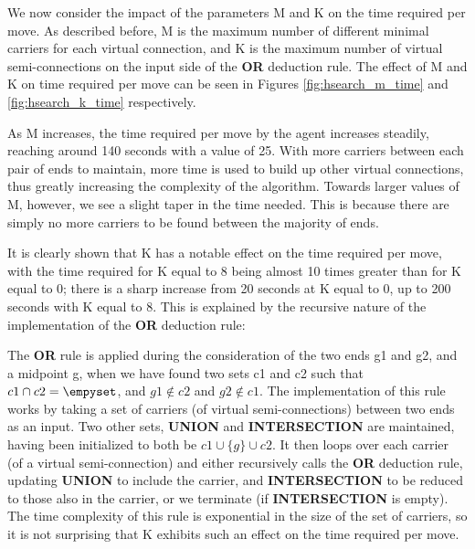 We now consider the impact of the parameters M and K on the time required per move. As described before, M is the maximum number of different minimal carriers for each virtual connection, and K is the maximum number of virtual semi-connections on the input side of the \textbf{OR} deduction rule. The effect of M and K on time required per move can be seen in Figures \ref{fig:hsearch_m_time} and \ref{fig:hsearch_k_time} respectively. 

As M increases, the time required per move by the agent increases steadily, reaching around 140 seconds with a value of 25. With more carriers between each pair of ends to maintain, more time is used to build up other virtual connections, thus greatly increasing the complexity of the algorithm. Towards larger values of M, however, we see a slight taper in the time needed. This is because there are simply no more carriers to be found between the majority of ends.

It is clearly shown that K has a notable effect on the time required per move, with the time required for K equal to 8 being almost 10 times greater than for K equal to 0; there is a sharp increase from 20 seconds at K equal to 0, up to 200 seconds with K equal to 8. This is explained by the recursive nature of the implementation of the \textbf{OR} deduction rule:

The \textbf{OR} rule is applied during the consideration of the two ends g1 and g2, and a midpoint g, when we have found two sets c1 and c2 such that $c1 \cap c2 = \empyset$, and $g1 \notin c2$ and $g2 \notin c1$. The implementation of this rule works by taking a set of carriers (of virtual semi-connections) between two ends as an input. Two other sets, \textbf{UNION} and \textbf{INTERSECTION} are maintained, having been initialized to both be $c1 \cup \{g\} \cup c2$. It then loops over each carrier (of a virtual semi-connection) and either recursively calls the \textbf{OR} deduction rule, updating \textbf{UNION} to include the carrier, and \textbf{INTERSECTION} to be reduced to those also in the carrier, or we terminate (if \textbf{INTERSECTION} is empty). The time complexity of this rule is exponential in the size of the set of carriers, so it is not surprising that K exhibits such an effect on the time required per move.

